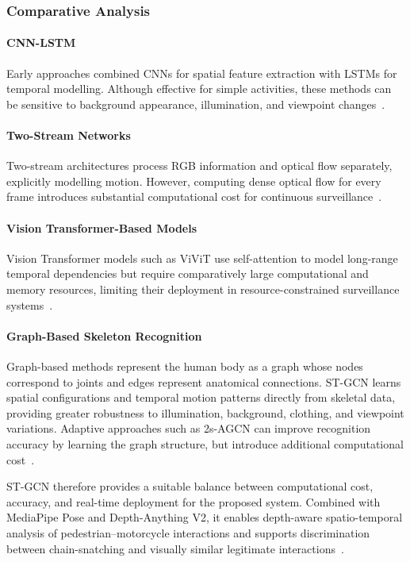\documentclass[runningheads]{llncs}
\begin{document}
\subsubsection{Comparative Analysis}

\paragraph{CNN-LSTM}
Early approaches combined CNNs for spatial feature extraction with LSTMs for temporal modelling. Although effective for simple activities, these methods can be sensitive to background appearance, illumination, and viewpoint changes~\cite{cnnlstm}.

\paragraph{Two-Stream Networks}
Two-stream architectures process RGB information and optical flow separately, explicitly modelling motion. However, computing dense optical flow for every frame introduces substantial computational cost for continuous surveillance~\cite{twostreamlstm}.

\paragraph{Vision Transformer-Based Models}
Vision Transformer models such as ViViT use self-attention to model long-range temporal dependencies but require comparatively large computational and memory resources, limiting their deployment in resource-constrained surveillance systems~\cite{liu2022video}.

\paragraph{Graph-Based Skeleton Recognition}
Graph-based methods represent the human body as a graph whose nodes correspond to joints and edges represent anatomical connections. ST-GCN learns spatial configurations and temporal motion patterns directly from skeletal data, providing greater robustness to illumination, background, clothing, and viewpoint variations. Adaptive approaches such as 2s-AGCN can improve recognition accuracy by learning the graph structure, but introduce additional computational cost~\cite{shi2019twostreamagcn,yan2018stgcn}.

ST-GCN therefore provides a suitable balance between computational cost, accuracy, and real-time deployment for the proposed system. Combined with MediaPipe Pose and Depth-Anything V2, it enables depth-aware spatio-temporal analysis of pedestrian--motorcycle interactions and supports discrimination between chain-snatching and visually similar legitimate interactions~\cite{yan2018stgcn}.
\end{document}
